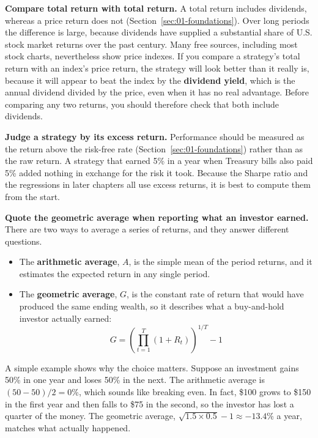 \textbf{Compare total return with total return.} A total return includes dividends, whereas a price return does not (Section~\ref{sec:01-foundations}). Over long periods the difference is large, because dividends have supplied a substantial share of U.S. stock market returns over the past century. Many free sources, including most stock charts, nevertheless show price indexes. If you compare a strategy's total return with an index's price return, the strategy will look better than it really is, because it will appear to beat the index by the \textbf{dividend yield}, which is the annual dividend divided by the price, even when it has no real advantage. Before comparing any two returns, you should therefore check that both include dividends.

\textbf{Judge a strategy by its excess return.} Performance should be measured as the return above the risk-free rate (Section~\ref{sec:01-foundations}) rather than as the raw return. A strategy that earned 5\% in a year when Treasury bills also paid 5\% added nothing in exchange for the risk it took. Because the Sharpe ratio and the regressions in later chapters all use excess returns, it is best to compute them from the start.

\textbf{Quote the geometric average when reporting what an investor earned.} There are two ways to average a series of returns, and they answer different questions.

\begin{itemize}
  \item The \textbf{arithmetic average}, $A$, is the simple mean of the period returns, and it estimates the expected return in any single period.
  \item The \textbf{geometric average}, $G$, is the constant rate of return that would have produced the same ending wealth, so it describes what a buy-and-hold investor actually earned:
  \begin{equation}
    G = \left(\prod_{t=1}^{T} (1 + R_t)\right)^{1/T} - 1
    \label{eq:02-geometric}
  \end{equation}
\end{itemize}

A simple example shows why the choice matters. Suppose an investment gains 50\% in one year and loses 50\% in the next. The arithmetic average is $(50 - 50)/2 = 0$\%, which sounds like breaking even. In fact, \$100 grows to \$150 in the first year and then falls to \$75 in the second, so the investor has lost a quarter of the money. The geometric average, $\sqrt{1.5 \times 0.5} - 1 \approx -13.4$\% a year, matches what actually happened.

